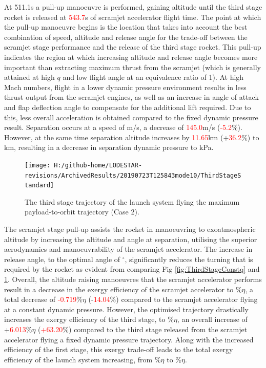  At 511.1s a pull-up manoeuvre is performed, gaining altitude until the third stage rocket is released at \textcolor{red}{543.7}s of scramjet accelerator flight time. 
 The point at which the pull-up manoeuvre begins is the location that takes into account the best combination of speed, altitude and release angle for the trade-off between the scramjet stage performance and the release of the third stage rocket. This pull-up indicates the region at which increasing altitude and release angle becomes more important than extracting maximum thrust from the scramjet (which is generally attained at high $q$ and low flight angle at an equivalence ratio of 1).
At high Mach numbers, flight in a lower dynamic pressure environment results in less thrust output from the scramjet engines, as well as an increase in angle of attack and flap deflection angle to compensate for the additional lift required. Due to this, less overall acceleration is obtained compared to the fixed dynamic pressure result. Separation occurs at a speed of \secondthirdSeparationvStandardNoReturn m/s, a decrease of \textcolor{red}{145.0}m/s (\textcolor{red}{-5.2}\%). However, at the same time separation altitude increases by \textcolor{red}{11.65}km (+\textcolor{red}{36.2}\%) to \secondthirdSeparationAltqStandardNoReturn km, resulting in a decrease in separation dynamic pressure to \secondthirdSeparationqStandardNoReturn kPa. 
\begin{figure}[ht!]%
	\centering
	\texttt{[image: H:/github-home/LODESTAR-revisions/ArchivedResults/20190723T125843mode10/ThirdStageStandard]}
	\caption{The third stage trajectory of the launch system flying the maximum payload-to-orbit trajectory (Case 2).}
	\label{fig:ThirdStageStandardNoReturn}
\end{figure}
The scramjet stage pull-up assists the rocket in manoeuvring to exoatmospheric altitude by increasing the altitude and angle at separation, utilising the superior aerodynamics and manoeuvrability of the scramjet accelerator. The increase in release angle, to the optimal angle of \secondthirdSeparationgammaStandardNoReturn$^\circ$, significantly reduces the turning that is required by the rocket as evident from comparing Fig \ref{fig:ThirdStageConstq} and \ref{fig:ThirdStageStandardNoReturn}. 
Overall, the altitude raising manoeuvres that the scramjet accelerator performs result in a decrease in the exergy efficiency of the scramjet accelerator to \secondExergyEffStandardNoReturn\%$\eta$, a total decrease of \textcolor{red}{-0.719}\%$\eta$ (-\textcolor{red}{14.04}\%) compared to the scramjet accelerator flying at a constant dynamic pressure. However, the optimised trajectory drastically increases the exergy efficiency of the third stage, to \thirddExergyEffStandardNoReturn\%$\eta$, an overall increase of +\textcolor{red}{6.013}\%$\eta$ (\textcolor{red}{+63.20}\%) compared to the third stage released from the scramjet accelerator flying a fixed dynamic pressure trajectory.  
Along with the increased efficiency of the first stage, this exergy trade-off leads to the total exergy efficiency of the launch system increasing, from \totalExergyEffConstqNoReturn\%$\eta$ to \totalExergyEffStandardNoReturn\%$\eta$. 

